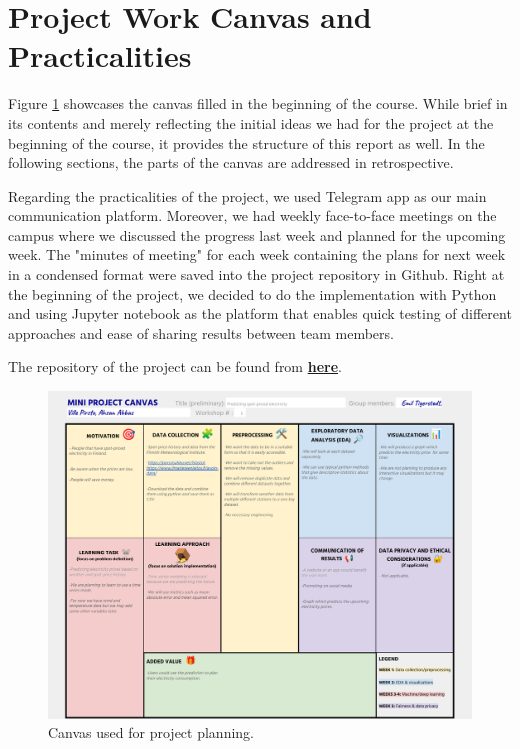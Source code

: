 \documentclass{article}
\numberwithin{equation}{section}
\begin{document}
\clearpage
\section{Project Work Canvas and Practicalities}
Figure \ref{fig1} showcases the canvas filled in the beginning of the course. While brief in its contents and merely reflecting the initial ideas we had for the project at the beginning of the course, it provides the structure of this report as well. In the following sections, the parts of the canvas are addressed in retrospective.

Regarding the practicalities of the project, we used Telegram app as our main communication platform. Moreover, we had weekly face-to-face meetings on the campus where we discussed the progress last week and planned for the upcoming week. The "minutes of meeting" for each week containing the plans for next week in a condensed format were saved into the project repository in Github. Right at the beginning of the project, we decided to do the implementation with Python and using Jupyter notebook as the platform that enables quick testing of different approaches and ease of sharing results between team members.

The repository of the project can be found from \href{https://github.com/pirstov/Intro_to_DS_project}{\textbf{here}}.



\begin{figure}[htb]
	\centering
	\includegraphics[width=1\textwidth]{./mini_project_canvas.pdf}
	\caption{Canvas used for project planning.}
	\label{fig1}
\end{figure}
\end{document}
